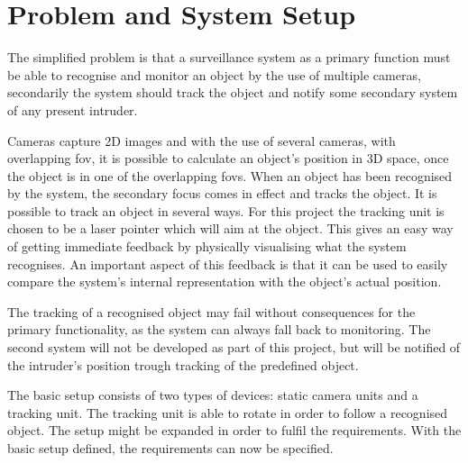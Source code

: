 \section{Problem and System Setup}\label{sec:base_setup}
The simplified problem is that a surveillance system as a primary function must be able to recognise and monitor an object by the use of multiple cameras, secondarily the system should track the object and notify some secondary system of any present intruder.

Cameras capture 2D images and with the use of several cameras, with overlapping \gls{fov}, it is possible to calculate an object's position in 3D space, once the object is in one of the overlapping \glspl{fov}. When an object has been recognised by the system, the secondary focus comes in effect and tracks the object. It is possible to track an object in several ways. For this project the tracking unit is chosen to be a laser pointer which will aim at the object. This gives an easy way of getting immediate feedback by physically visualising what the system recognises. An important aspect of this feedback is that it can be used to easily compare the system's internal representation with the object's actual position. 

The tracking of a recognised object may fail without consequences for the primary functionality, as the system can always fall back to monitoring. The second system will not be developed as part of this project, but will be notified of the intruder's position trough tracking of the predefined object.

The basic setup consists of two types of devices: static camera units and a tracking unit. The tracking unit is able to rotate in order to follow a recognised object. The setup might be expanded in order to fulfil the requirements. With the basic setup defined, the requirements can now be specified. 